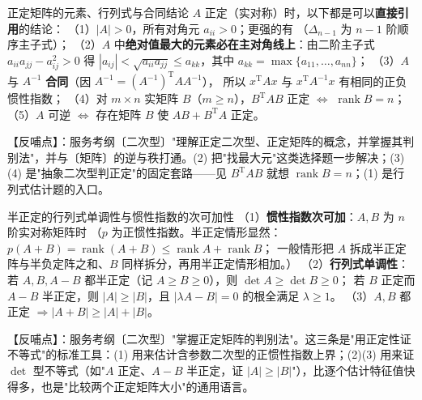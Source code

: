 \begin{fdeep}{正定矩阵的元素、行列式与合同结论}
$A$ 正定（实对称）时，以下都是可以\textbf{直接引用}的结论：
（1）$|A|>0$，所有对角元 $a_{ii}>0$；更强的有
（$\Delta_{n-1}$ 为 $n-1$ 阶顺序主子式）；
（2）$A$ 中\textbf{绝对值最大的元素必在主对角线上}：由二阶主子式 $a_{ii}a_{jj}-a_{ij}^{2}>0$
得 $|a_{ij}|<\sqrt{a_{ii}a_{jj}}\le a_{kk}$，其中 $a_{kk}=\max\{a_{11},\dots,a_{nn}\}$；
（3）$A$ 与 $A^{-1}$ \textbf{合同}（因 $A^{-1}=(A^{-1})^{\mathrm T}AA^{-1}$），
所以 $x^{\mathrm T}Ax$ 与 $x^{\mathrm T}A^{-1}x$ 有相同的正负惯性指数；
（4）对 $m\times n$ 实矩阵 $B$（$m\ge n$），$B^{\mathrm T}AB$ 正定 $\iff$ $\operatorname{rank}B=n$；
（5）$A$ 可逆 $\iff$ 存在矩阵 $B$ 使 $AB+B^{\mathrm T}A$ 正定。

【反哺点】：服务考纲〔二次型〕"理解正定二次型、正定矩阵的概念，并掌握其判别法"，并与〔矩阵〕的逆与秩打通。(2) 把"找最大元"这类选择题一步解决；(3)(4) 是"抽象二次型判正定"的固定套路——见 $B^{\mathrm T}AB$ 就想 $\operatorname{rank}B=n$；(1) 是行列式估计题的入口。
\end{fdeep}

\begin{fdeep}{半正定的行列式单调性与惯性指数的次可加性}
（1）\textbf{惯性指数次可加}：$A,B$ 为 $n$ 阶实对称矩阵时
（$p$ 为正惯性指数。半正定情形显然：$p(A+B)=\operatorname{rank}(A+B)\le\operatorname{rank}A+\operatorname{rank}B$；
一般情形把 $A$ 拆成半正定阵与半负定阵之和、$B$ 同样拆分，再用半正定情形相加。）
（2）\textbf{行列式单调性}：若 $A,B,A-B$ 都半正定（记 $A\ge B\ge0$），则 $\det A\ge\det B\ge0$；
若 $B$ 正定而 $A-B$ 半正定，则 $|A|\ge|B|$，且 $|\lambda A-B|=0$ 的根全满足 $\lambda\ge1$。
（3）$A,B$ 都正定 $\Longrightarrow |A+B|\ge|A|+|B|$。

【反哺点】：服务考纲〔二次型〕"掌握正定矩阵的判别法"。这三条是"用正定性证不等式"的标准工具：(1) 用来估计含参数二次型的正惯性指数上界；(2)(3) 用来证 $\det$ 型不等式（如"$A$ 正定、$A-B$ 半正定，证 $|A|\ge|B|$"），比逐个估计特征值快得多，也是"比较两个正定矩阵大小"的通用语言。
\end{fdeep}

